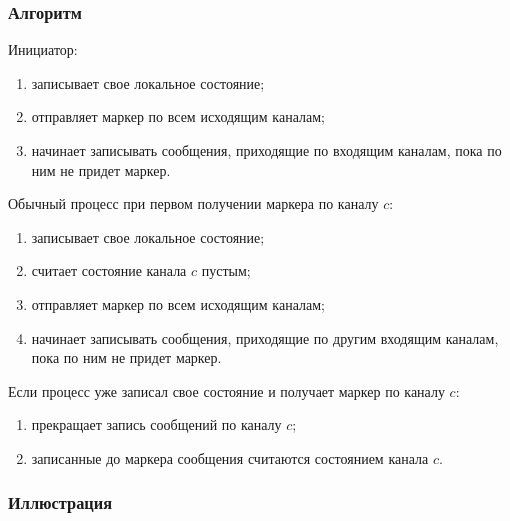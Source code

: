 \documentclass[12pt,a4paper]{article}
\begin{document}
\subsubsection{Алгоритм}

Инициатор:
\begin{enumerate}
    \item записывает свое локальное состояние;
    \item отправляет маркер по всем исходящим каналам;
    \item начинает записывать сообщения, приходящие по входящим каналам, пока по ним не придет маркер.
\end{enumerate}

Обычный процесс при первом получении маркера по каналу $c$:
\begin{enumerate}
    \item записывает свое локальное состояние;
    \item считает состояние канала $c$ пустым;
    \item отправляет маркер по всем исходящим каналам;
    \item начинает записывать сообщения, приходящие по другим входящим каналам, пока по ним не придет маркер.
\end{enumerate}

Если процесс уже записал свое состояние и получает маркер по каналу $c$:
\begin{enumerate}
    \item прекращает запись сообщений по каналу $c$;
    \item записанные до маркера сообщения считаются состоянием канала $c$.
\end{enumerate}

\subsubsection{Иллюстрация}

\begin{center}
\end{center}
\end{document}
